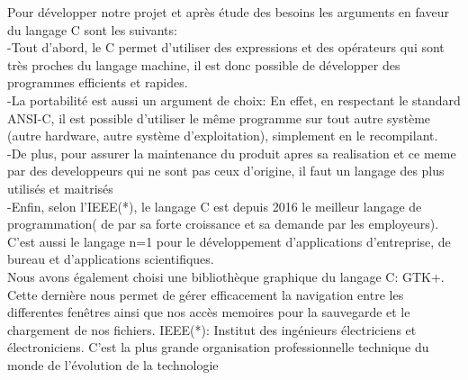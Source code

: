 \documentclass[a4]{article}
\begin{document}
Pour développer notre projet et après étude des besoins les arguments en faveur du langage C sont les suivants:\\

-Tout d'abord, le C permet d'utiliser des expressions et des opérateurs qui sont très proches du langage machine, 
il est donc possible de développer des programmes efficients et rapides.\\

-La portabilité est aussi un argument de choix: En effet, en respectant le standard ANSI-C, il est possible d'utiliser
le même programme sur tout autre système (autre hardware, autre système d'exploitation), simplement en le recompilant.\\

-De plus, pour assurer la maintenance du produit apres sa realisation et ce meme par des developpeurs qui ne sont
pas ceux d'origine, il faut un langage des plus utilisés et maitrisés\\

-Enfin, selon l'IEEE(*), le langage C est depuis 2016 le meilleur langage de 
programmation( de par sa forte croissance et sa demande par les employeurs). C'est aussi le langage n=1 pour le développement
d’applications d’entreprise, de bureau et d'applications scientifiques.\\

Nous avons également choisi une bibliothèque graphique du langage C: GTK+. Cette dernière nous permet de gérer efficacement
la navigation entre les differentes fenêtres
ainsi que nos accès memoires pour la sauvegarde et le chargement de nos fichiers. 
IEEE(*):  Institut des ingénieurs électriciens et électroniciens.
C'est la plus grande organisation professionnelle technique du monde de l'évolution de la technologie
\end{document}
